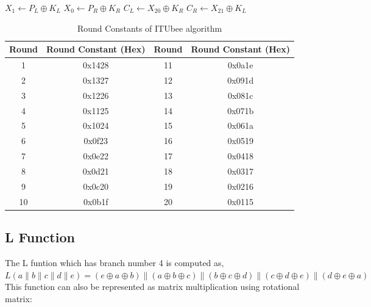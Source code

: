 \begin{algorithm}[H]
    \DontPrintSemicolon
    $X_1 \gets P_L \oplus K_L$ \;
    $X_0 \gets P_R \oplus K_R$ \;
    $C_L \gets X_{20} \oplus K_R$\;
    $C_R \gets X_{21} \oplus K_L$\;
    \caption{Pseudo code for ITUbee encryption}
    \label{alg:ITUbee}
\end{algorithm}

\begin{table}[H]
    \centering
    \caption{Round Constants of ITUbee algorithm}
    \begin{tabular}{|c|c|c|c|}
        \hhline{|=|=|=|=|}
        \textbf{Round} & \textbf{Round Constant (Hex)} & \textbf{Round} & \textbf{Round Constant (Hex)} \\
        \hline
        1  & 0x1428 & 11 & 0x0a1e \\
        2  & 0x1327 & 12 & 0x091d \\
        3  & 0x1226 & 13 & 0x081c \\
        4  & 0x1125 & 14 & 0x071b \\
        5  & 0x1024 & 15 & 0x061a \\
        6  & 0x0f23 & 16 & 0x0519 \\
        7  & 0x0e22 & 17 & 0x0418 \\
        8  & 0x0d21 & 18 & 0x0317 \\
        9  & 0x0c20 & 19 & 0x0216 \\
        10 & 0x0b1f & 20 & 0x0115 \\
        \hline
    \end{tabular}
    
    \label{tab:ITUbee_rc}
\end{table}

\subsection{L Function}
The L funtion which has branch number 4 is computed as,\\
$L(a \parallel b \parallel c \parallel d \parallel e) = (e \oplus a \oplus b) \parallel (a \oplus b \oplus c) \parallel (b \oplus c \oplus d) \parallel (c \oplus d \oplus e) \parallel (d \oplus e \oplus a)$
\\This function can also be represented as matrix multiplication using rotational matrix:

